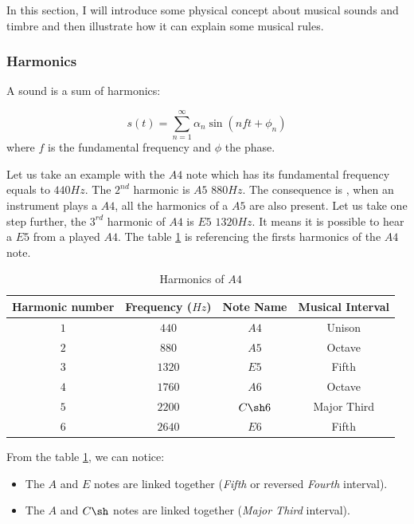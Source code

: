 \documentclass[12pt]{report}
\begin{document}
In this section, I will introduce some physical concept about musical sounds and timbre and then illustrate how it can explain some musical rules.

\subsubsection{Harmonics}

A sound is a sum of harmonics:

\begin{equation}
    s(t) = \sum_{n=1}^{\infty} \alpha_{n} \sin(n f t + \phi_{n})
\end{equation}
where $f$ is the fundamental frequency and $\phi$ the phase.

Let us take an example with the $A4$ note which has its fundamental frequency equals to $440 Hz$.
The $2^{nd}$ harmonic is $A5$ $880Hz$.
The consequence is , when an instrument plays a $A4$, all the harmonics of a $A5$ are also present.
Let us take one step further, the $3^{rd}$ harmonic of $A4$ is $E5$ $1320Hz$. It means it is possible to hear a $E5$ from a played $A4$.
The table \ref{tab:A4_harmonics} is referencing the firsts harmonics of the $A4$ note.

\begin{table} [ht]
    \begin{center}
        \begin{tabular} {c||c|c|c}
            Harmonic number & Frequency ($Hz$) & Note Name & Musical Interval \\
            \hline
            $1$ & $440$ & $A4$ & Unison \\
            $2$ & $880$ & $A5$ & Octave \\
            $3$ & $1320$ & $E5$ & Fifth \\
            $4$ & $1760$ & $A6$ & Octave \\
            $5$ & $2200$ & $C\sh6$ & Major Third \\
            $6$ & $2640$ & $E6$ & Fifth \\
        \end{tabular}
        \caption{Harmonics of $A4$}
        \label{tab:A4_harmonics}
    \end{center}
\end{table}

From the table \ref{tab:A4_harmonics}, we can notice:
\begin{itemize}
    \item The $A$ and $E$ notes are linked together (\textit{Fifth} or reversed \textit{Fourth} interval).
    \item The $A$ and $C\sh$ notes are linked together (\textit{Major Third} interval).
\end{itemize}
\end{document}
